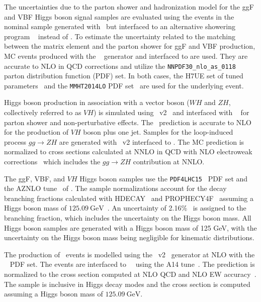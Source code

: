 {The uncertainties due to the parton shower and hadronization model for the ggF and VBF Higgs boson signal samples are evaluated using the events in the nominal sample generated with \POWHEG\ but interfaced to an alternative showering program
~\cite{Bahr:2008pv,Bellm:2015jjp} instead of . To estimate the uncertainty related to the matching between the matrix element and the parton shower for ggF and VBF production, MC events produced with the \MGFiveNLO~\cite{Alwall:2014hca} generator and interfaced to  are used. They are accurate to NLO in QCD corrections and utilize the \texttt{NNPDF30\_nlo\_as\_0118}~\cite{Ball:2014uwa} parton distribution function (PDF) set.
In both cases, the H7UE set of tuned parameters~\cite{Bellm:2015jjp} and the \texttt{MMHT2014LO} PDF set~\cite{Harland-Lang:2014zoa} are used for the underlying event.

Higgs boson production in association with a vector boson ($WH$ and $ZH$, collectively referred to as $VH$) is simulated using \powhegbox~v2~\cite{Nason:2009ai,Alioli:2010xd,Nason:2004rx,Frixione:2007vw} and interfaced with ~\cite{Sjostrand:2014zea} for parton shower and non-perturbative effects.
The \POWHEG\ prediction is accurate to NLO for the production of $VH$ boson plus one jet. Samples for the loop-induced process $gg \to ZH$ are generated with \powhegbox~v2 interfaced to .
The MC prediction is normalized to cross sections calculated at NNLO in QCD with NLO electroweak corrections~\cite{Ciccolini:2003jy, Brein:2003wg, Brein:2011vx, Denner:2014cla, Brein:2012ne} which includes the $gg \to ZH$ contribution at NNLO.

The ggF, VBF, and $VH$ Higgs boson samples use the \texttt{PDF4LHC15}~\cite{Butterworth:2015oua} PDF set and the AZNLO tune~\cite{STDM-2012-23} of . The sample normalizations account for the decay branching fractions calculated with \textsc{HDECAY}~\cite{Djouadi:1997yw, Spira:1997dg, Djouadi:2006bz} and \textsc{PROPHECY4F}~\cite{Bredenstein:2006ha, Bredenstein:2006rh, Bredenstein:2006nk} assuming a Higgs boson mass of $\SI{125.09}{\GeV}$~\cite{HIGG-2014-14}. An uncertainty of 2.16\%~\cite{deFlorian:2016spz} is assigned to the \hww branching fraction, which includes the uncertainty on the Higgs boson mass. All Higgs boson samples are generated with a Higgs boson mass of 125 GeV, with the uncertainty on the Higgs boson mass being negligible for kinematic distributions.

The production of \ttH\ events is modelled using the \powhegbox~v2~\cite{Frixione:2007nw,Nason:2004rx,Frixione:2007vw,Alioli:2010xd,Hartanto:2015uka} generator at NLO with the \nnpdfnlo~\cite{Ball:2014uwa} PDF set.
The events are interfaced to ~\cite{Sjostrand:2014zea}~using the A14 tune~\cite{ATL-PHYS-PUB-2014-021}.
The prediction is normalized to the cross section computed at NLO QCD and NLO EW accuracy~\cite{deFlorian:2016spz}.
The sample is inclusive in Higgs decay modes and the cross section is computed assuming a Higgs boson mass of $\SI{125.09}{\GeV}$.}
